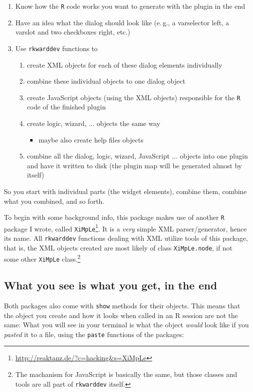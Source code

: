 \documentclass[a4paper,10pt]{scrartcl}
\begin{document}
\begin{enumerate}
	\item Know how the \texttt{R} code works you want to generate with the plugin in the end
	\item Have an idea what the dialog should look like (e.\,g., a varselector left, a varslot and two checkboxes right, etc.)
	\item Use \texttt{rkwarddev} functions to
	\begin{enumerate}
		\item create XML objects for each of these dialog elements individually
		\item combine these individual objects to one dialog object
		\item create JavaScript objects (using the XML objects) responsible for the \texttt{R} code of the finished plugin
		\item create logic, wizard, ... objects the same way
		\begin{itemize}
			\item maybe also create help files objects
		\end{itemize}
		\item combine all the dialog, logic, wizard, JavaScript ... objects into one plugin and have it written to disk (the plugin map will be generated almost by itself)
	\end{enumerate}
\end{enumerate}

So you start with individual parts (the widget elements), combine them, combine what you combined, and so forth. 

To begin with some background info, this package makes use of another \texttt{R} package I wrote, called
\texttt{XiMpLe}\footnote{\url{http://reaktanz.de/?c=hacking\&s=XiMpLe}}. It is a \textit{very} simple XML parser/generator, hence its name.
All \texttt{rkwarddev} functions dealing with XML utilize tools of this package, that is, the XML objects created are most likely of class
\texttt{XiMpLe.node}, if not some other \texttt{XiMpLe} class.\footnote{The machanism for JavaScript is basically the same, but those classes and tools
are all part of \texttt{rkwarddev} itself.}

\subsection{What you see is what you get, in the end}
Both packages also come with \texttt{show} methods for their objects. This means that the object you create and how it looks when called
in an R session are not the same: What you will see in your terminal is what the object \textit{would} look like if you \textit{pasted} it
to a file, using the \texttt{paste} functions of the packages:
\end{document}
